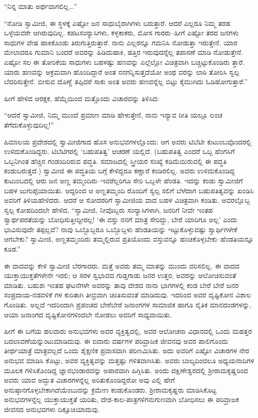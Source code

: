 “ನಿನ್ನ ಮಾತು ಅರ್ಥವಾಗಲಿಲ್ಲ...”

“ನೋಡಿ ಸ್ವಾಮೀಜಿ, ಈ ಸ್ಥಳಕ್ಕೆ ಎಷ್ಟೋ ಜನ ಸಾಧುಬೈರಾಗಿಗಳು ಬರುತ್ತಾರೆ. ಆದರೆ ಎಲ್ಲರೂ ನಿಮ್ಮ ತರಹ ಒಳ್ಳೆಯವರೇ ಆಗಿರುವುದಿಲ್ಲ. ಕಪಟಸಂನ್ಯಾಸಿಗಳು, ಕಳ್ಳಕಾಕರು, ಮೋಸ ಗಾರರು–ಹೀಗೆ ಎಷ್ಟೋ ತರದ ಜನಗಳು ಸಾಧುಗಳ ವೇಷ ಹಾಕಿಕೊಂಡು ತಿರುಗುತ್ತಿರುತ್ತಾರೆ. ನಾನು ಎಲ್ಲರನ್ನೂ ಗಮನಿಸಿ ನೋಡುತ್ತಾ ಇರುತ್ತೇನೆ. ಯಾರ ಮೇಲಾದರೂ ಗುಮಾನಿ ಬಂದರೆ ಅವರನ್ನು ಹಿಡಿದುಹಾಕಿ, ಹತ್ತಿರ ಇರುವುದನ್ನೆಲ್ಲ ತಪಾಸಣೆ ಮಾಡಿ ನೋಡುತ್ತೇನೆ. ಎಷ್ಟೋ ಸಲ ಈ ತೋರಿಕೆಯ ಸಾಧುಗಳು ಬಹಳಷ್ಟು ಹಣವನ್ನು ಎಲ್ಲೆಲ್ಲೋ ವಿಚಿತ್ರವಾಗಿ ಬಚ್ಚಿಟ್ಟುಕೊಂಡಿರು ತ್ತಾರೆ. ಯಾರು ಹಣವನ್ನು ಅಕ್ರಮವಾಗಿ ಹೊಂದಿದ್ದಾರೆ ಅಂತ ನನಗನ್ನಿಸುತ್ತದೆಯೋ ಅಂಥ ವರನ್ನು ಲಾಠಿ ತೋರಿಸಿ ಸ್ವಲ್ಪ ಬೆದರಿಸುತ್ತೇನೆ. ಬೀಸುವ ದೊಣ್ಣೆ ತಪ್ಪಿದರೆ ಸಾಕು ಅಂತ ಅವರು ಹಣವನ್ನೆಲ್ಲ ಬಿಟ್ಟು ಕೈಮುಗಿದು ಓಡಿಹೋಗುತ್ತಾರೆ.”

ಹೀಗೆ ಹೇಳಿದ ಆರಕ್ಷಕ, ಹೆಮ್ಮೆಯಿಂದ ಮತ್ತೊಂದು ವಿಚಾರವನ್ನು ತಿಳಿಸಿದ:

“ಆದರೆ ಸ್ವಾಮೀಜಿ, ನಿಮ್ಮ ಮುಂದೆ ಪ್ರಮಾಣ ಮಾಡಿ ಹೇಳುತ್ತೇನೆ, ನಾನು ಇನ್ಯಾವ ರೀತಿ ಯಲ್ಲೂ ಲಂಚ ತೆಗೆದುಕೊಳ್ಳುವುದಿಲ್ಲ!”

ಹಿಮಾಲಯ ಪ್ರದೇಶದಲ್ಲಿ ಸ್ವಾಮೀಜಿಗಾದ ಹೊಸ ಅನುಭವಗಳಲ್ಲೊಂದು: ಆಗ ಅವರು ಟಿಬೆಟೀ ಕುಟುಂಬವೊಂದರಲ್ಲಿ ಉಳಿದುಕೊಂಡಿದ್ದರು. ಟಿಬೆಟಿಗರಲ್ಲಿ ‘ಬಹುಪತಿತ್ವ’ ಆಚರಣೆ ಯಲ್ಲಿದೆ. (ಬಹುಪತಿತ್ವ ಎಂದರೆ ಒಬ್ಬ ಹೆಂಗಸಿಗೆ ಒಬ್ಬನಿಗಿಂತ ಹೆಚ್ಚಿನ ಗಂಡಂದಿರಿರುವ ಪದ್ಧತಿ. ಸಮಾಜದಲ್ಲಿ ಸ್ತ್ರೀಯರ ಸಂಖ್ಯೆ ಕಡಿಮೆಯಿರುವಲ್ಲಿ ಈ ಪದ್ಧತಿ ಕಂಡುಬರುತ್ತದೆ.) ಸ್ವಾಮೀಜಿ ಈ ಪದ್ಧತಿಯ ಬಗ್ಗೆ ಕೇಳಿದ್ದರೂ ಕಣ್ಣಾರೆ ಕಂಡಿರಲಿಲ್ಲ. ಅವರು ಉಳಿದುಕೊಂಡಿದ್ದ ಕುಟುಂಬದಲ್ಲಿ ಆರು ಜನ ಅಣ್ಣ ತಮ್ಮಂದಿರು–ಇವರೆಲ್ಲರಿಗೂ ಸೇರಿ ಒಬ್ಬಳೇ ಹೆಂಡತಿ. ಇದನ್ನು ಕಂಡು ಸ್ವಾಮೀಜಿಗೆ ಬಹಳ ಜುಗುಪ್ಸೆಯಾಯಿತು. ಆದ್ದರಿಂದ ಆ ಅಣ್ಣತಮ್ಮಂದಿ ರೊಂದಿಗೆ ಸ್ವಲ್ಪ ಸಲಿಗೆ ಬೆಳೆದಾಗ ಬಹುಪತಿತ್ವವನ್ನು ಖಂಡಿಸಿ ಅವರಿಗೆ ತಿಳಿಯಹೇಳಿದರು. ಆದರೆ ಆ ಸೋದರರಿಗೆ ಸ್ವಾಮೀಜಿಯ ವಾದ ಬಹಳ ವಿಚಿತ್ರವಾಗಿ ಕಂಡಿತು. ಅವರಲ್ಲೊಬ್ಬ ಸ್ವಲ್ಪ ಕೋಪದಿಂದಲೇ ಹೇಳಿದ, “ಸ್ವಾಮೀಜಿ, ನೀವೊಬ್ಬರು ಸಂನ್ಯಾಸಿಗಳಾಗಿ, ಜನರಿಗೆ ನೀವೇ ಇಂತಹ ಸ್ವಾರ್ಥಪರತೆಯನ್ನು ಬೋಧಿಸುತ್ತೀದ್ದೀರಲ್ಲ! ‘ಈ ವಸ್ತು ನನಗೆ ಮಾತ್ರ ಸೇರಿದ್ದು, ಬೇರೆ ಯಾರಿಗೂ ಅಲ್ಲ’ ಎಂದು ಭಾವಿಸುವುದೇ ತಪ್ಪಲ್ಲವೆ? ನಾವು ಒಬ್ಬೊಬ್ಬರೂ ಒಬ್ಬೊಬ್ಬಳು ಹೆಂಡತಿಯನ್ನು ಇಟ್ಟುಕೊಳ್ಳುವಷ್ಟು ಸ್ವಾರ್ಥಿಗಳೇಕೆ ಆಗಬೇಕು? ಸ್ವಾಮೀಜಿ, ಅಣ್ಣತಮ್ಮಂದಿರು ತಮ್ಮಲ್ಲಿರುವ ಪ್ರತಿಯೊಂದು ವಸ್ತುವನ್ನೂ ಹಂಚಿಕೊಳ್ಳಬೇಕು–ಹೆಂಡತಿಯನ್ನೂ ಕೂಡ.”

ಈ ವಾದವನ್ನು ಕೇಳಿ ಸ್ವಾಮೀಜಿ ಬೆರಗಾದರು. ಮತ್ತೆ ಅವರು ತಮ್ಮ ಮಾತನ್ನು ಮುಂದು ವರಿಸಲಿಲ್ಲ. ಈ ವಾದದ ಯುಕ್ತಾಯುಕ್ತತೆಗಳೇನೇ ಇರಲಿ; ಆ ಸರಳ ಸ್ವಭಾವದ ಗುಡ್ಡಗಾಡು ಜನರ ಉತ್ತರ, ಅವರನ್ನು ಆಲೋಚಿಸುವಂತೆ ಮಾಡಿತು. ಬಹುಶಃ ಇಂತಹ ಘಟನೆಗಳೇ ಅವರನ್ನು ತಾವು ದೇಶದ ನಾನಾ ಭಾಗಗಳಲ್ಲಿ ಕಂಡ ಬೇರೆ ಬೇರೆ ಜನರ ಸಂಪ್ರದಾಯ-ನಡವಳಿಕೆ ಗಳ ಕುರಿತಾಗಿ ತೀವ್ರವಾಗಿ ಚಿಂತಿಸುವಂತೆ ಮಾಡಿದುವು. ಇದರಿಂದ ಅವರ ದೃಷ್ಟಿಕೋನ ವಿಶಾಲ ಗೊಂಡಿತು. ಅಲ್ಲದೆ ಇದರಿಂದಾಗಿ ಪ್ರಪಂಚದ ಬೇರೆಬೇರೆ ಜನಾಂಗಗಳ ಸಾಮಾಜಿಕ ಹಾಗೂ ನೈತಿಕ ಮಾನದಂಡಗಳನ್ನು, ಆಯಾ ಜನಾಂಗದ ದೃಷ್ಟಿಕೋನಗಳಿಂದಲೇ ನೋಡಲು ಅವರಿಗೆ ಸಾಧ್ಯವಾಯಿತು.

ಹೀಗೆ ಈ ಬಗೆಯ ಹಲವಾರು ಅನುಭವಗಳು ಅವರ ವ್ಯಕ್ತಿತ್ವದಲ್ಲಿ, ಅವರ ಆಲೋಚನಾ ವಿಧಾನದಲ್ಲಿ ಒಂದು ಮಹತ್ತರ ಬದಲಾವಣೆಯನ್ನುಂಟುಮಾಡಿದುವು. ಈ ಐದಾರು ವರ್ಷಗಳ ಪರಿವ್ರಾಜಕ ಜೀವನವು ಅವರ ಪಾಲಿಗೊಂದು ತೀರ್ಥಯಾತ್ರೆ ಮಾತ್ರವಲ್ಲದೆ ಒಂದು ಶೈಕ್ಷಣಿಕ ಪ್ರವಾಸವಾಗಿ ಪರಿಣಮಿಸಿತು. ಅದು ಅವರಿಗೆ ಎಷ್ಟೋ ವಿಚಾರಗಳ ನೇರ ಅನುಭವ ಮಾಡಿಸಿ ಕೊಟ್ಟು, ಅವರ ವ್ಯಕ್ತಿತ್ವವನ್ನು ಮತ್ತಷ್ಟು ಗಳಿತವಾಗಿಸಿತು. ಅವರು ಬಾಲ್ಯದಿಂದಲೂ ಅಧ್ಯಯನಾದಿಗಳ ಮೂಲಕ ಗಳಿಸಿಕೊಂಡಿದ್ದ ಜ್ಞಾನಭಂಡಾರವನ್ನು ಅಪಾರವಾಗಿ ಹಿಗ್ಗಿಸಿತು. ಅಂದು ದಕ್ಷಿಣೇಶ್ವರದಲ್ಲಿ ಶ್ರೀರಾಮಕೃಷ್ಣರಿಂದ ಅವರು ಯಾವ ಅದ್ಭುತ ವಿಚಾರಗಳನ್ನೆಲ್ಲ ಅರಿತುಕೊಂಡಿದ್ದರೋ ಅವು ಎಲ್ಲಿ ಹೇಗೆ ಅನುಷ್ಠಾನಗೊಳ್ಳಬೇಕಾಗಿದೆಯೆಂಬುದನ್ನು ಕ್ರಮೇಣ ಕಂಡುಕೊಂಡರು. ಶ್ರೀರಾಮಕೃಷ್ಣರು ಮಾಡಿಸಿಕೊಟ್ಟ ಅನುಭವಗಳನ್ನೆಲ್ಲ ಯುಕ್ತಾಯುಕ್ತತೆ ಯರಿತು, ದೇಶ-ಕಾಲ-ಪಾತ್ರಗಳಿಗನುಗುಣವಾಗಿ ಬೋಧಿಸಲು ಈ ಪರಿವ್ರಾಜಕ ಜೀವನದ ಅನುಭವಗಳು ದಿಕ್ಸೂಚಿಯಾದುವು.

